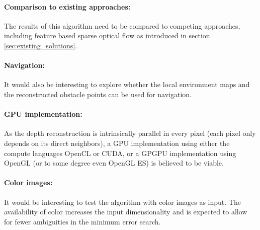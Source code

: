 \paragraph{Comparison to existing approaches:} The results of this algorithm need to be compared to competing approaches, including feature based sparse optical flow as introduced in section \ref{sec:existing_solutions}.

\paragraph{Navigation:} It would also be interesting to explore whether the local environment maps and the reconstructed obstacle points can be used for navigation.

\paragraph{GPU implementation:} As the depth reconstruction is intrinsically parallel in every pixel (each pixel only depends on its direct neighbors), a GPU implementation using either the compute languages OpenCL or CUDA, or a GPGPU implementation using OpenGL (or to some degree even OpenGL ES) is believed to be viable.

\paragraph{Color images:} It would be interesting to test the algorithm with color images as input. The availability of color increases the input dimensionality and is expected to allow for fewer ambiguities in the minimum error search.
